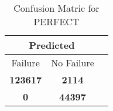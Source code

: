 \begin{table}[] 
\caption{Confusion Matric for PERFECT} 
\label{Table: Prediction Accuracy-DMDPERFECTOnlySunEKF-resetReflectionEKF-top2-Reflection} 
\centering 
\begin{tabular} 
 {@{}ccc@{}} 
\toprule 
\multicolumn{2}{c}{\textbf{Predicted}}
 \\ \midrule 
\multicolumn{1}{|c|}{Failure} & 
\multicolumn{1}{c|}{No Failure}
 \\ \midrule 
\multicolumn{1}{|c|}{\color{green}\textbf{123617}} & 
\multicolumn{1}{c|}{\color{red}\textbf{2114}}
 \\ \midrule 
\multicolumn{1}{|c|}{\color{red}\textbf{0}} & 
\multicolumn{1}{c|}{\color{green}\textbf{44397}}
 \\ \bottomrule 
\end{tabular} 
\end{table} 
